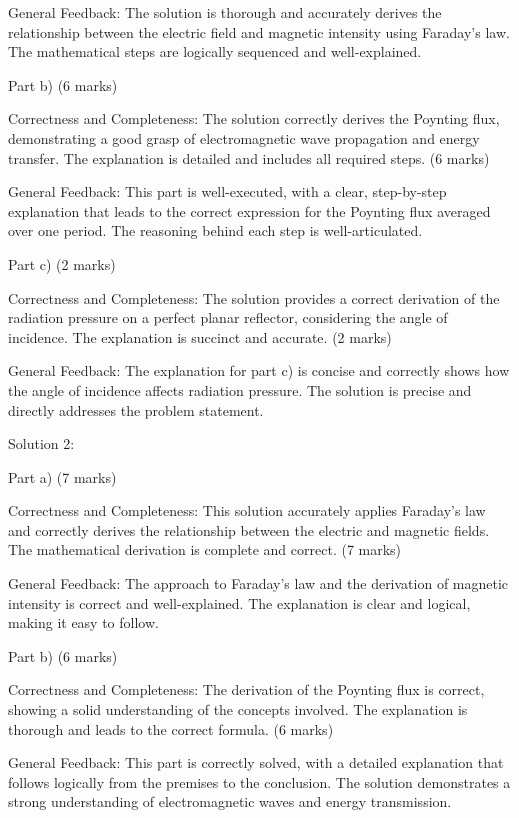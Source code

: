 \documentclass[a4paper,11pt]{article}
\begin{document}
General Feedback: The solution is thorough and accurately derives the relationship between the electric field and magnetic intensity using Faraday's law. The mathematical steps are logically sequenced and well-explained.

Part b) (6 marks)

Correctness and Completeness: The solution correctly derives the Poynting flux, demonstrating a good grasp of electromagnetic wave propagation and energy transfer. The explanation is detailed and includes all required steps. (6 marks)

General Feedback: This part is well-executed, with a clear, step-by-step explanation that leads to the correct expression for the Poynting flux averaged over one period. The reasoning behind each step is well-articulated.

Part c) (2 marks)

Correctness and Completeness: The solution provides a correct derivation of the radiation pressure on a perfect planar reflector, considering the angle of incidence. The explanation is succinct and accurate. (2 marks)

General Feedback: The explanation for part c) is concise and correctly shows how the angle of incidence affects radiation pressure. The solution is precise and directly addresses the problem statement.

Solution 2:

Part a) (7 marks)

Correctness and Completeness: This solution accurately applies Faraday's law and correctly derives the relationship between the electric and magnetic fields. The mathematical derivation is complete and correct. (7 marks)

General Feedback: The approach to Faraday's law and the derivation of magnetic intensity is correct and well-explained. The explanation is clear and logical, making it easy to follow.

Part b) (6 marks)

Correctness and Completeness: The derivation of the Poynting flux is correct, showing a solid understanding of the concepts involved. The explanation is thorough and leads to the correct formula. (6 marks)

General Feedback: This part is correctly solved, with a detailed explanation that follows logically from the premises to the conclusion. The solution demonstrates a strong understanding of electromagnetic waves and energy transmission.
\end{document}
